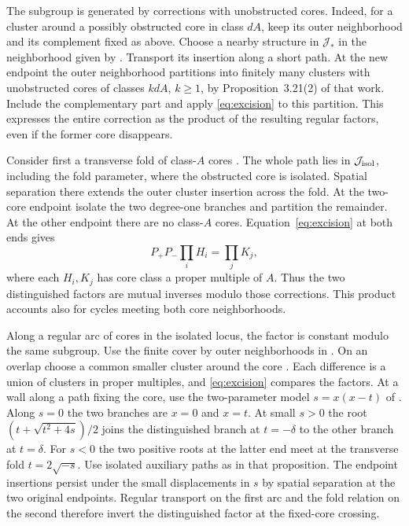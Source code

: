 The subgroup is generated by corrections with unobstructed cores.
Indeed, for a cluster around a possibly obstructed core in class $dA$,
keep its outer neighborhood and its complement fixed as above. Choose
a nearby structure in $\mathcal J_*$ in the neighborhood given by
\cite[Propositions~3.14 and~3.21]{DIW}. Transport its insertion along
a short path. At the new endpoint the outer neighborhood partitions
into finitely many clusters with unobstructed cores of classes $kdA$,
$k\ge1$, by Proposition~3.21(2) of that work. Include the complementary
part and apply \eqref{eq:excision} to this partition. This expresses
the entire correction as the product of the resulting regular factors,
even if the former core disappears.

Consider first a transverse fold of class-$A$ cores
\cite[Proposition~3.33]{DIW}. The whole path lies in
$\mathcal J_{\rm isol}$, including the fold parameter, where the
obstructed core is isolated. Spatial separation there extends the
outer cluster insertion across the fold. At the two-core endpoint isolate
the two degree-one branches and partition the remainder. At the other
endpoint there are no class-$A$ cores. Equation~\eqref{eq:excision} at
both ends gives
\[
             P_+P_-\prod_i H_i=\prod_j K_j,
\]
where each $H_i,K_j$ has core class a proper multiple of $A$. Thus the
two distinguished factors are mutual inverses modulo those corrections.
This product accounts also for cycles meeting both core neighborhoods.

Along a regular arc of cores in the isolated locus, the factor is
constant modulo the same subgroup. Use the finite cover by outer
neighborhoods in \cite[Proposition~3.30]{DIW}. On an overlap choose
a common smaller cluster around the core
\cite[Proposition~3.19]{DIW}. Each difference is a union of clusters
in proper multiples, and \eqref{eq:excision} compares the factors.
At a wall along a path fixing the core, use the two-parameter model
$s=x(x-t)$ of \cite[Proposition~3.37]{DIW}. Along $s=0$ the two branches
are $x=0$ and $x=t$. At small $s>0$ the root
$(t+\sqrt{t^2+4s})/2$ joins the distinguished branch at $t=-\delta$
to the other branch at $t=\delta$. For $s<0$ the two positive roots
at the latter end meet at the transverse fold $t=2\sqrt{-s}$.
Use isolated auxiliary paths as in that proposition. The endpoint
insertions persist under the small displacements in $s$ by spatial
separation at the two original endpoints. Regular transport on the
first arc and the fold relation on the second therefore invert the
distinguished factor at the fixed-core crossing.

